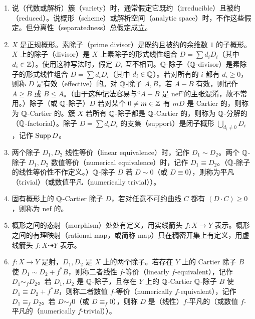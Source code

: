 \begin{enumerate}[label=(\arabic*),leftmargin=2.6em,itemsep=2pt,topsep=2pt]
\item[(0)] 说（代数或解析）簇（variety）时，通常假定它既约（irreducible）且被约（reduced）。说概形（scheme）或解析空间（analytic space）时，不作这些假定。但分离性（separatedness）总假定成立。

\item $X$ 是正规概形。素除子（prime divisor）是既约且被约的余维数 $1$ 的子概形。$X$ 上的除子（divisor）是 $X$ 上素除子的形式线性组合 $D=\sum d_iD_i$（其中 $d_i\in\mathbb{Z}$）。使用这种写法时，假定 $D_i$ 互不相同。$\mathbb{Q}$-除子（$\mathbb{Q}$-divisor）是素除子的形式线性组合 $D=\sum d_iD_i$（其中 $d_i\in\mathbb{Q}$）。若对所有的 $i$ 都有 $d_i\ge 0$，则称 $D$ 是有效（effective）的。对 $\mathbb{Q}$-除子 $A,B$，若 $A-B$ 有效，则记作 $A\ge B$ 或 $B\le A$。（由于这种记法容易与“$A-B$ 是 nef”的主张混淆，故不常用。）除子（或 $\mathbb{Q}$-除子）$D$ 若对某个 $0\ne m\in\mathbb{Z}$ 有 $mD$ 是 Cartier 的，则称为 $\mathbb{Q}$-Cartier 的。簇 $X$ 若所有 $\mathbb{Q}$-除子都是 $\mathbb{Q}$-Cartier 的，则称为 $\mathbb{Q}$-分解的（$\mathbb{Q}$-factorial）。除子 $D=\sum d_iD_i$ 的支集（support）是闭子概形 $\bigcup_{d_i\ne 0}D_i$，记作 $\operatorname{Supp} D$。

\item 两个除子 $D_1,D_2$ 线性等价（linear equivalence）时，记作 $D_1\sim D_2$。两个 $\mathbb{Q}$-除子 $D_1,D_2$ 数值等价（numerical equivalence）时，记作 $D_1\equiv D_2$。（$\mathbb{Q}$-除子的线性等价性不作定义。）$\mathbb{Q}$-除子 $D$ 若 $D\sim 0$（或 $D\equiv 0$），则称为平凡（trivial）（或数值平凡（numerically trivial））。

\item 固有概形上的 $\mathbb{Q}$-Cartier 除子 $D$，若对任意不可约曲线 $C$ 都有 $(D\cdot C)\ge 0$，则称为 nef 的。

\item 概形之间的态射（morphism）处处有定义，用实线箭头 $f\colon X\to Y$ 表示。概形之间的有理映射（rational map，或简称 map）只在稠密开集上有定义，用虚线箭头 $f\colon X\dashrightarrow Y$ 表示。

\item $f\colon X\to Y$ 是射，$D_1,D_2$ 是 $X$ 上的两个除子。若存在 $Y$ 上的 Cartier 除子 $B$ 使 $D_1\sim D_2+f^*B$，则称二者线性 $f$-等价（linearly $f$-equivalent），记作 $D_1\sim_f D_2$。若 $D_1,D_2$ 是 $\mathbb{Q}$-除子，且存在 $Y$ 上的 $\mathbb{Q}$-Cartier $\mathbb{Q}$-除子 $B$ 使 $D_1\equiv D_2+f^*B$，则称二者数值 $f$-等价（numerically $f$-equivalent），记作 $D_1\equiv_f D_2$。若 $D\sim_f 0$（或 $D\equiv_f 0$），则称 $D$ 是（线性）$f$-平凡的（或数值 $f$-平凡的（numerically $f$-trivial））。


\end{enumerate}
